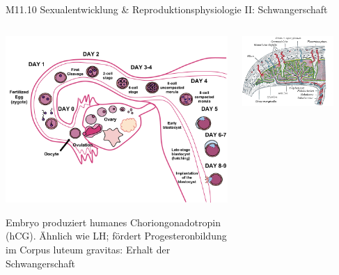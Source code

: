 \documentclass{beamer}
\begin{document}
\begin{frame}{M11.10 Sexualentwicklung \& Reproduktionsphysiologie II: Schwangerschaft}

\begin{columns}[c]

\begin{column}{5cm}

\begin{center}
    \includegraphics[width=\textwidth]{Human_Fertilization.png}
\end{center}

Embryo produziert humanes Choriongonadotropin (hCG). Ähnlich wie LH; fördert Progesteronbildung im Corpus luteum gravitas: Erhalt der Schwangerschaft 
\end{column}

\pause

\begin{column}{5cm}


\begin{center}
\includegraphics[width=0.8\textwidth]{Plazenta.png}    
\end{center}


\end{column}
\end{columns}
\end{frame}
\end{document}
